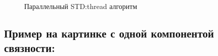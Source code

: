 \documentclass{report}
\begin{document}
\begin{figure}[H]
\caption{Параллельный STD:thread алгоритм}
\end{figure}

\subsection*{Пример на картинке с одной компонентой связности:} 
\end{document}
